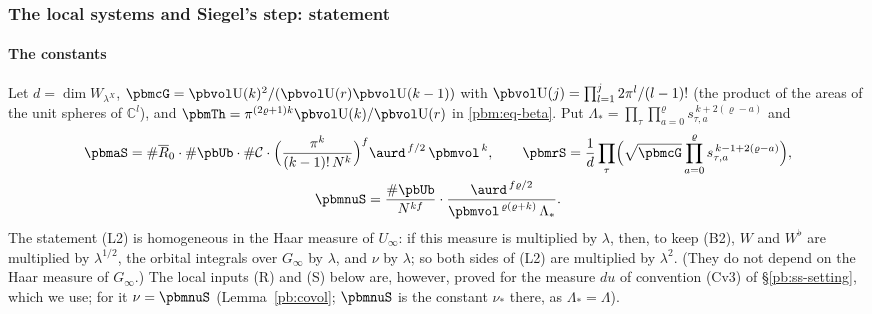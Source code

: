 \documentclass[10pt]{amsart}
\theoremstyle{definition}
\theoremstyle{remark}
\newcommand{\C}{\mathbb C}
\providecommand{\auU}{\mathrm U}
\providecommand{\pbR}{\overline R_0}
\begin{document}
\subsubsection{The local systems and Siegel's step: statement}\label{pbm:ss-inputs}

\paragraph*{The constants}
Let $d=\dim W_{\lambda^X}$, $\pbmcG=\pbvol\auU(k)^2/(\pbvol\auU(r)\pbvol\auU(k-1))$ with $\pbvol
\auU(j)=\prod_{l=1}^j2\pi^l/(l-1)!$ (the product of the areas of the unit spheres of $\C^l$), and
$\pbmTh=\pi^{(2\varrho+1)k}\pbvol\auU(k)/\pbvol\auU(r)$ in \eqref{pbm:eq-beta}. Put
$\Lambda_*=\prod_\tau\prod_{a=0}^{\varrho}s_{\tau,a}^{\,k+2(\varrho-a)}$ and
\begin{equation}\label{pbm:eq-consts}
\begin{gathered}
\pbmaS=\#\pbR\cdot\#\pbUb\cdot\#\mathcal C\cdot\Bigl(\frac{\pi^k}{(k-1)!\,N^k}\Bigr)^f\aurd^{\,f/2}\,\pbmvol^{
\,k},\qquad\pbmrS=\frac1d\prod_\tau\Bigl(\sqrt{\pbmcG}\prod_{a=0}^{\varrho}s_{\tau,a}^{\,k-1+2(\varrho-a)}
\Bigr),\\
\pbmnuS=\frac{\#\pbUb}{N^{kf}}\cdot\frac{\aurd^{\,f\varrho/2}}{\pbmvol^{\,\varrho(\varrho+k)}\,\Lambda_*} .
\end{gathered}
\end{equation}
The statement \textup{(L2)} is homogeneous in the Haar measure of $U_\infty$: if this measure is
multiplied by $\lambda$, then, to keep (B2), $W$ and $W^\flat$ are multiplied by $\lambda^{1/2}$,
the orbital integrals over $G_\infty$ by $\lambda$, and $\nu$ by $\lambda$; so both sides of
\textup{(L2)} are multiplied by $\lambda^2$. (They do not depend on the Haar measure of $G_\infty$.)
The local inputs (R) and (S) below are, however, proved for the measure $du$ of convention (Cv3) of
\S\ref{pb:ss-setting}, which we use; for it $\nu=\pbmnuS$ (Lemma~\ref{pb:covol}; $\pbmnuS$ is the
constant $\nu_*$ there, as $\Lambda_*=\Lambda$).
\end{document}
